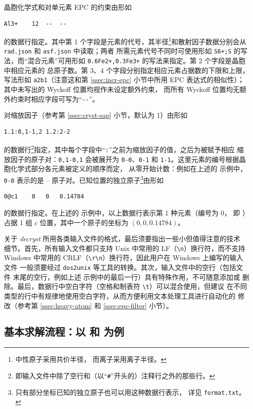 晶胞化学式和对单元素 EPC 的约束由形如
\begin{Verbatim}
Al3+	12	--	--
\end{Verbatim}
的数据行指定。其中第 1 个字段是元素的代号，其半径\footnote{%
	中性原子采用共价半径\parencite{cordero2008}，
	而离子采用离子半径\parencite{shannon1976}。%
}和散射因子数据分别会从 \verb|rad.json| 和 \verb|asf.json| 中读取；两者
所需元素代号不同时可使用形如 \verb|S6+;S| 的写法，而“混合元素”可用形如
\verb|0.6Fe2+,0.3Fe3+| 的写法来指定。第 2 个字段是晶胞中相应元素的
总原子数。第 3、4 个字段分别指定相应元素占据数的下限和上限，
写法形如 \verb|a2b1|（注意这和第 \ref{ssec:incr-epc} 小节中所用
EPC 表达式的相似性）；其中未写出的 Wyckoff 位置均视作未设定额外约束，
而所有 Wyckoff 位置均无额外约束时相应字段可写为“\verb|--|”。

对缩放因子（参考第 \ref{ssec:cryst-sap} 小节，默认为 1）由形如
\begin{Verbatim}
1.1:0,1-1,2	1.2:2-2
\end{Verbatim}
的数据行\footnote{%
	即输入文件中除了空行和（以“\texttt{\#}”开头的）注释行之外的那些行。%
}指定，其中每个字段中“\verb|:|”之前为缩放因子的值，之后为被赋予相应
缩放因子的原子对：\verb|0,1-0,1| 会被展开为 \verb|0-0|、\verb|0-1| 和
\verb|1-1|。这里元素的编号根据晶胞化学式部分各元素被定义的顺序而定，
从零开始计数：例如在上述的  示例中，\verb|0-0| 表示的是
-- 原子对。已知位置的独立原子\footnote{%
	只有部分坐标已知的独立原子也可以用这种数据行表示，
	详见 \texttt{format.txt}。%
}由形如
\begin{Verbatim}
0@c1	0	0	0.14784
\end{Verbatim}
的数据行指定。在上述的  示例中，以上数据行表示第 1 种元素（编号为 0，
即 ）占据 1 组 $c$ 位置，其中一个原子的坐标为 $(0, 0, 0.14784)$。

关于 \emph{decryst} 所用各类输入文件的格式，最后须要指出一些小但值得注意的技术
细节。首先，所有输入文件都只支持 Unix 中常用的 LF（\verb|\n|）换行符，而不支持
Windows 中常用的 CRLF（\verb|\r\n|）换行符，因此用户在 Windows 上编写的输入文件
一般须要经过 \verb|dos2unix| 等工具的转换。其次，输入文件中的空行（包括文件
末尾的空行，例如上述  示例中的最后一行）具有特殊作用，不可随意添加或
删除。最后，数据行中空白字符（空格和制表符 \verb|\t|）可以混合使用，但建议
在不同类型的行中有规律地使用空白字符，从而方便利用文本处理工具进行自动化的
修改（参考第 \ref{ssec:heavy-atom} 和 \ref{ssec:epc-filter} 小节）。

\subsection{基本求解流程：以  和  为例}\label{ssec:decr-base}

